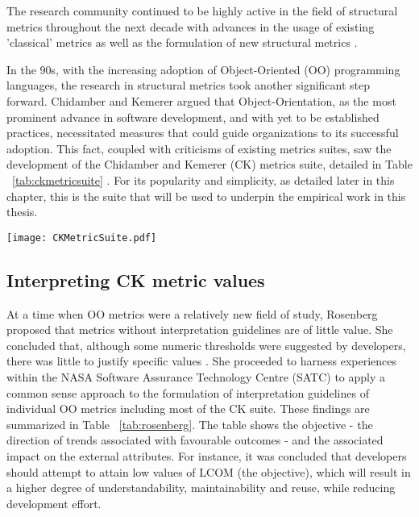 The research community continued to be highly active in the field of structural metrics throughout the next decade \citep{cote1988software} with advances in the usage of existing 'classical' metrics \citep{behrens1983measuring, gaffney1981metrics} as well as the formulation of new structural metrics \citep{boydston1984programming, prather1984axiomatic}.

In the 90s, with the increasing adoption of Object-Oriented (OO) programming languages, the research in structural metrics took another significant step forward. Chidamber and Kemerer argued that Object-Orientation, as the most prominent advance in software development, and with yet to be established practices, necessitated measures that could guide organizations to its successful adoption. This fact, coupled with criticisms of existing metrics suites, saw the development of the Chidamber and Kemerer (CK) metrics suite, detailed in Table ~\ref{tab:ckmetricsuite} \citep{chidamber1994metrics}. For its popularity and simplicity, as detailed later in this chapter, this is the suite that will be used to underpin the empirical work in this thesis.

\begin{table}
\begin{tabular}
 \centering 
 \texttt{[image: CKMetricSuite.pdf]}
 \label{tab:ckmetricsuite}
\end{tabular}
\end{table}

\subsection{Interpreting CK metric values}
At a time when OO metrics were a relatively new field of study, Rosenberg proposed that metrics without interpretation guidelines are of little value. She concluded that, although some numeric thresholds were suggested by developers, there was little to justify specific values \citep{rosenberg1998applying}. She proceeded to harness experiences within the NASA Software Assurance Technology Centre (SATC) to apply a common sense approach to the formulation of interpretation guidelines of individual OO metrics including most of the CK suite. These findings are summarized in Table ~\ref{tab:rosenberg}. The table shows the objective  - the direction of trends associated with favourable outcomes - and the associated impact on the external attributes. For instance, it was concluded that developers should attempt to attain low values of LCOM (the objective), which will result in a higher degree of understandability, maintainability and reuse, while reducing development effort. 

